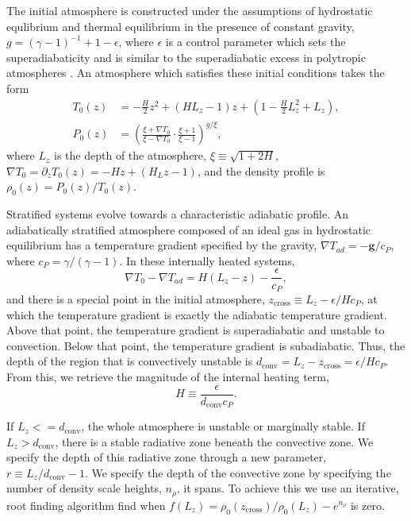 \documentclass[titlepage, twocolumn, fontsize=10]{aastex6}
\newcommand{\grad}{\ensuremath{\nabla}}
\begin{document}
The initial atmosphere is constructed under the assumptions of hydrostatic equlibrium
and thermal equilibrium in the presence of constant gravity, $g = (\gamma - 1)^{-1} + 1 - \epsilon$,
where $\epsilon$ is a control parameter which sets the superadiabaticity and is similar to
the superadiabatic excess in polytropic atmospheres \cite{anders&brown2017, graham1975}.
An atmosphere which satisfies these initial conditions takes the form
\begin{equation}
\begin{split}
T_0(z) &= -\frac{H}{2} z^2 + (H L_z - 1) z + \left(1 - \frac{H}{2}L_z^2 + L_z\right), \\
P_0(z) &= \left(\frac{\xi + \grad T_0}{\xi - \grad T_0} \cdot\frac{\xi + 1}{\xi - 1}\right)^{g/\xi},
\end{split}
\end{equation}
where $L_z$ is the depth of the atmosphere, $\xi \equiv \sqrt{1 + 2H}$, 
$\grad T_0 = \partial_z T_0(z) = -H z + (H_Lz - 1)$,
and the density profile is $\rho_0(z) = P_0(z)/T_0(z)$.

Stratified systems evolve towards a characteristic adiabatic profile.  An adiabatically
stratified atmosphere composed of an ideal gas in hydrostatic equilibrium has a
temperature gradient specified by the gravity, $\grad T_{ad} = -\bm{g} / c_P$, where
$c_P = \gamma/(\gamma-1)$.  In these internally heated systems,
\begin{equation}
\grad T_0 - \grad T_{ad} = H(L_z - z) - \frac{\epsilon}{c_P},
\end{equation}
and there is a special point in the initial atmosphere, $z_{\text{cross}} \equiv L_z - \epsilon / H c_P$,
at which the temperature gradient is exactly the adiabatic temperature gradient.  Above that point,
the temperature gradient is superadiabatic and unstable to convection.  Below that point,
the temperature gradient is subadiabatic.  Thus, the depth of the region that is convectively
unstable is $d_{\text{conv}} = L_z - z_{\text{cross}} = \epsilon / H c_P$.  From this,
we retrieve the magnitude of the internal heating term,
\begin{equation}
H \equiv \frac{\epsilon}{d_{\text{conv}} c_P}.
\end{equation}

If $L_z <= d_{\text{conv}}$, the whole atmosphere is unstable or marginally stable.
If $L_z > d_{\text{conv}}$, there is a stable radiative zone beneath the convective
zone.  We specify the depth of this radiative zone through a new parameter,
$r \equiv L_z/d_{\text{conv}} - 1$.  We specify the depth of the convective zone by
specifying the number of density scale heights, $n_\rho$, it spans.  To achieve this we
use an iterative, root finding algorithm find when
$f(L_z) = \rho_0(z_{\text{cross}})/\rho_0(L_z) -  e^{n_\rho}$ is zero.
\end{document}
